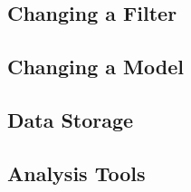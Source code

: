 \subsection{Changing a Filter}

\subsection{Changing a Model}

\subsection{Data Storage}

\subsection{Analysis Tools}


